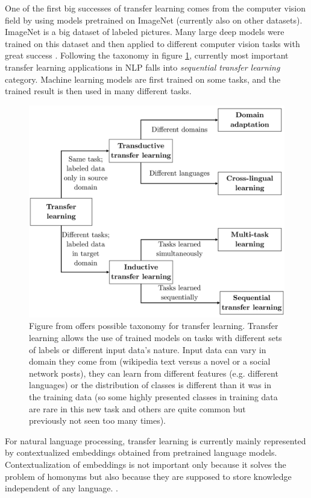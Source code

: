 One of the first big successes of transfer learning comes from the computer vision field by using models pretrained on ImageNet (currently also on other datasets). ImageNet %
is a big dataset of labeled pictures. %
Many large deep models were trained on this dataset and then applied to different computer vision tasks with great success \citep{Huh}. %
Following the taxonomy in figure \ref{pic:tl_taxonomy}, currently most important transfer learning applications in NLP falls into \textit{sequential transfer learning} category. Machine learning models are first trained on some tasks, and the trained result is then used in many different tasks.

\begin{figure}[h]
\centering
\includegraphics[width=0.7\columnwidth]{../img/tl_taxonomy}
\caption{Figure from \protect\citep{Ruder2019} offers possible taxonomy for transfer learning. %
Transfer learning allows the use of trained models on tasks with different sets of labels or different input data's nature. Input data can vary in domain they come from (wikipedia text versus a novel or a social network posts), they can learn from different features (e.g. different languages) or the distribution of classes is different than it was in the training data (so some highly presented classes in training data are rare in this new task and others are quite common but previously not seen too many times).
}
\label{pic:tl_taxonomy}
\end{figure}
For natural language processing, transfer learning is currently mainly represented by contextualized embeddings obtained from pretrained language models.
Contextualization of embeddings is not important only because it solves the problem of homonyms but also because they are supposed to store knowledge independent of any language.  \citep{Feijo2020}.  %


